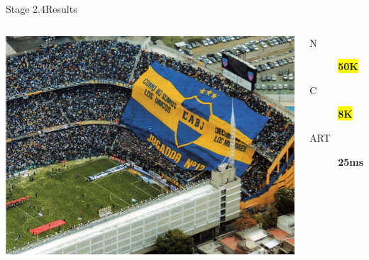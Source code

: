 \documentclass[utf8]{beamer}
\begin{document}
\begin{frame}{Stage 2.4}{Results}
	\begin{columns}
			\includegraphics[top=-1,width=\textwidth]{img/results-3-4.jpg}
			\begin{description}
				\item[N] \textbf{\colorbox{yellow}{\Large 50K}}
				\item[C] \textbf{\colorbox{yellow}{\Large 8K}}
				\item[ART] \textbf{\Large 25ms}
			\end{description}
	\end{columns}
\end{frame}
\end{document}

